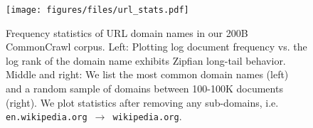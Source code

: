 \begin{figure}[t]
    \centering
    \texttt{[image: figures/files/url\_stats.pdf]}
    \caption{Frequency statistics of URL domain names in our 200B CommonCrawl corpus. Left: Plotting log document frequency vs. the log rank of the domain name exhibits Zipfian long-tail behavior.
    Middle and right: We list the most common domain names (left) and a random sample of domains between 100-100K documents (right).
    We plot statistics after removing any sub-domains, i.e. \texttt{en.wikipedia.org $\to$ wikipedia.org}.}
    \label{fig:url_stats}
\end{figure}
